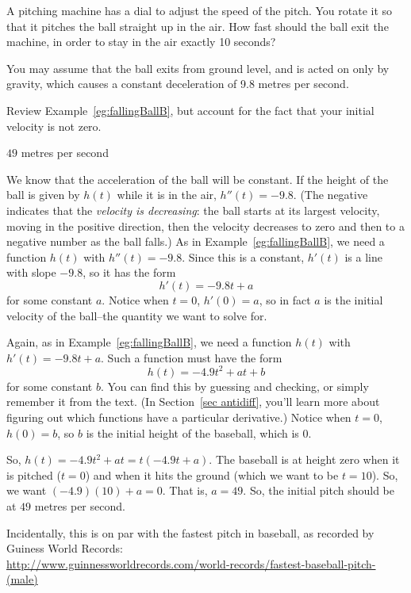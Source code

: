 \begin{question}
A pitching machine has a dial to adjust the speed of the pitch. You rotate it so that it pitches the ball straight up in the air. How fast should the ball exit the machine, in order to stay in the air exactly 10 seconds?

You may assume that the ball exits from ground level, and is acted on only by gravity, which causes a constant deceleration of 9.8 metres per second.
\end{question}
\begin{hint}
Review Example~\ref*{eg:fallingBallB}, but account for the fact that your initial velocity is not zero.
\end{hint}
\begin{answer}
$49$ metres per second
\end{answer}
\begin{solution}
We know that the acceleration of the ball will be constant. If the height of the ball is given by $h(t)$ while it is in the air, $h''(t)=-9.8$. (The negative indicates that the \emph{velocity is decreasing}: the ball starts at its largest velocity, moving in the positive direction, then the velocity decreases to zero and then to a negative number as the ball falls.) As in Example~\ref*{eg:fallingBallB}, we need a function $h(t)$ with $h''(t)=-9.8$. Since this is a constant, $h'(t)$ is a line with slope $-9.8$, so it has the form \[h'(t)=-9.8t+a\] for some constant $a$. Notice when $t=0$, $h'(0)=a$, so in fact $a$ is the initial velocity of the ball--the quantity we want to solve for.

Again, as in Example~\ref*{eg:fallingBallB}, we need a function $h(t)$ with $h'(t)=-9.8t+a$. Such a function must have the form \[h(t)=-4.9t^2+at+b\] for some constant $b$. You can find this by guessing and checking, or simply remember it from the text. (In Section~\ref*{sec antidiff}, you'll learn more about figuring out which functions have a particular derivative.) Notice when $t=0$, $h(0)=b$, so $b$ is the initial height of the baseball, which is 0.

So, $h(t)=-4.9t^2+at = t(-4.9t+a)$. The baseball is at height zero when it is pitched ($t=0$) and when it hits the ground (which we want to be $t=10$). So, we want $(-4.9)(10)+a=0$. That is, $a=49$. So, the initial pitch should be at $49$ metres per second.

Incidentally, this is on par with the fastest pitch in baseball, as recorded by Guiness World Records:\\ \small\url{http://www.guinnessworldrecords.com/world-records/fastest-baseball-pitch-(male)}
\end{solution}



